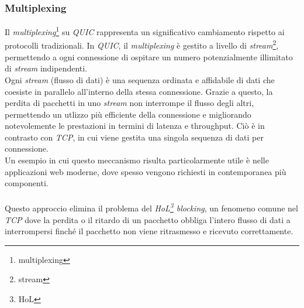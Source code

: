 \subsubsection{Multiplexing}
Il \emph{multiplexing}\footnote{\gls{multiplexing}} su \emph{QUIC} rappresenta un significativo cambiamento rispetto ai protocolli tradizionali. In \emph{QUIC}, il \emph{multiplexing} è gestito a livello di \emph{stream}\footnote{\gls{stream}}, permettendo a ogni connessione di ospitare un numero potenzialmente illimitato di \emph{stream} indipendenti.
\\
Ogni \emph{stream} (flusso di dati) è una sequenza ordinata e affidabile di dati che coesiste in parallelo all'interno della stessa connessione. Grazie a questo, la perdita di pacchetti in uno \emph{stream} non interrompe il flusso degli altri, permettendo un utlizzo più efficiente della connessione e migliorando notevolemente le prestazioni in termini di latenza e throughput. Ciò è in contrasto con \emph{TCP}, in cui viene gestita una singola sequenza di dati per connessione.
\\
Un esempio in cui questo meccanismo risulta particolarmente utile è nelle applicazioni web moderne,
dove spesso vengono richiesti in contemporanea più componenti. 
\\\\
Questo approccio elimina il problema del \emph{HoL\footnote{\gls{HoL}} blocking}, un fenomeno comune nel \emph{TCP} dove la perdita o il ritardo di un pacchetto obbliga l'intero flusso di dati a interrompersi  finché il pacchetto non viene ritrasmesso e ricevuto correttamente.

